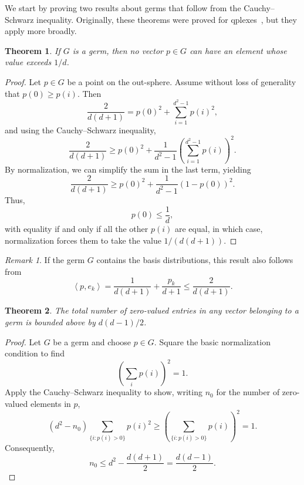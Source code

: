 \documentclass[aps,pra,superscriptaddress,10pt,tightenlines,twocolumn,nofootinbib]{revtex4}
\newtheorem{theorem}{Theorem}
\theoremstyle{remark}
\newtheorem*{remark}{Remark}
\newcommand{\pr}{G}
\newcommand{\inprod}[2]{{\left\langle #1 , #2 \right\rangle}}
\begin{document}
We start by proving two results about germs that follow from the
Cauchy--Schwarz inequality.  Originally, these theorems were proved
for qplexes~\cite{fuchs2009, appleby2011, fuchs2013}, but they apply
more broadly.

\begin{theorem}
If $\pr$ is a germ, then no vector $p \in \pr$ can have an element
  whose value exceeds $1/d$.
\end{theorem}
\begin{proof}
Let $p \in \pr$ be a point on the out-sphere.  Assume without loss of generality that $p(0) \geq p(i)$.  Then
\begin{equation}
\frac{2}{d(d+1)} = p(0)^2 + \sum_{i=1}^{d^2-1} p(i)^2,
\end{equation}
and using the Cauchy--Schwarz inequality,
\begin{equation}
\frac{2}{d(d+1)} \geq p(0)^2 + \frac{1}{d^2-1} \left(\sum_{i=1}^{d^2-1} p(i)\right)^2.
\end{equation}
By normalization, we can simplify the sum in the last term, yielding
\begin{equation}
\frac{2}{d(d+1)} \geq p(0)^2 + \frac{1}{d^2-1} \left(1 - p(0)\right)^2.
\end{equation}
Thus,
\begin{equation}
p(0) \leq \frac{1}{d},
\end{equation}
with equality if and only if all the other $p(i)$ are equal, in which case, normalization forces them to take the value $1/(d(d+1))$.
\end{proof}
\begin{remark}
If the germ $\pr$ contains the basis distributions, this result also follows from
\begin{equation}
\inprod{p}{e_k} = \frac{1}{d(d+1)} + \frac{p_k}{d+1} \leq \frac{2}{d(d+1)}.
\end{equation}
\end{remark}

\begin{theorem}
The total number of zero-valued entries in any vector belonging
  to a germ is bounded above by $d(d-1)/2$.
\end{theorem}
\begin{proof}
Let $\pr$ be a germ and choose $p \in \pr$.  Square the basic normalization condition to find
\begin{equation}
\left( \sum_i p(i) \right)^2 = 1.
\end{equation}
Apply the Cauchy--Schwarz inequality to show, writing $n_0$
for the number of zero-valued elements in $p$,
\begin{equation}
(d^2 - n_0) \sum_{\{i:p(i) >0\}} p(i)^2 \geq
 \left( \sum_{\{i:p(i) >0\}} p(i) \right)^2 = 1.
\end{equation}
Consequently,
\begin{equation}
n_0 \leq d^2 - \frac{d(d+1)}{2} = \frac{d(d-1)}{2}.
\label{eq:weak-zeros-bound}
\end{equation}
\end{proof}
\end{document}
